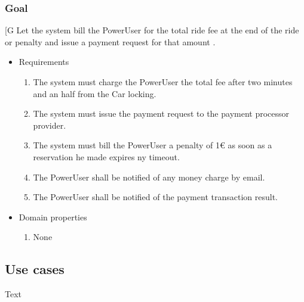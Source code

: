     \subsubsection{Goal }
    {[}G\arabic{goalctr}{]}
    Let the system bill the PowerUser for the total ride fee at the end of the ride or penalty and issue a payment request for that amount .
    \begin{itemize}
        \item Requirements
        \begin{enumerate}[REQ]
    			\item The system must charge the PowerUser the total fee after two minutes and an half from the Car locking.
    			\item The system must issue the payment request to the payment processor provider.	
    			\item The system must bill the PowerUser a penalty of 1$\euro$ as soon as a reservation he made expires ny timeout.
    			\item The PowerUser shall be notified of any money charge by email.
    			\item The PowerUser shall be notified of the payment transaction result.
        \end{enumerate}
        \item Domain properties
        \begin{enumerate}[PRO]
    			\item None
        \end{enumerate}
    \end{itemize}

\subsection{Use cases}
Text